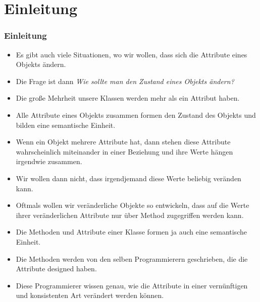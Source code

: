 \documentclass[aspectratio=169,mathserif,notheorems]{beamer}%
\subtitle{42.~Klassen:~Kapselung}%
\begin{document}
%
%
\startPresentation%
%
\section{Einleitung}%
\begin{frame}[t]%
\frametitle{Einleitung}%
\begin{itemize}%
%
%
%
%
%
\item<3-> Es gibt auch viele Situationen, wo wir wollen, dass sich die Attribute eines Objekts ändern.%
%
\item<4-> Die Frage ist dann \emph{Wie sollte man den Zustand eines Objekts ändern?}%
%
\item<5-> Die große Mehrheit unsere Klassen werden mehr als ein Attribut haben.%
%
\item<6-> Alle Attribute eines Objekts zusammen formen den Zustand des Objekts und bilden eine semantische Einheit.%
%
\item<7-> Wenn ein Objekt mehrere Attribute hat, dann stehen diese Attribute wahrscheinlich miteinander in einer Beziehung und ihre Werte hängen irgendwie zusammen.%
%
\item<8-> Wir wollen dann nicht, dass irgendjemand diese Werte beliebig veränden kann.%
%
\item<9-> Oftmals wollen wir veränderliche Objekte so entwickeln, dass auf die Werte ihrer veränderlichen Attribute nur über Method zugegriffen werden kann.%
%
\item<10-> Die Methoden und Attribute einer Klasse formen ja auch eine semantische Einheit.%
%
\item<11-> Die Methoden werden von den selben Programmierern geschrieben, die die Attribute designed haben.%
%
\item<12-> Diese Programmierer wissen genau, wie die Attribute in einer vernünftigen und konsistenten Art verändert werden können.%
\end{itemize}%
\end{frame}%
%
\end{document}

